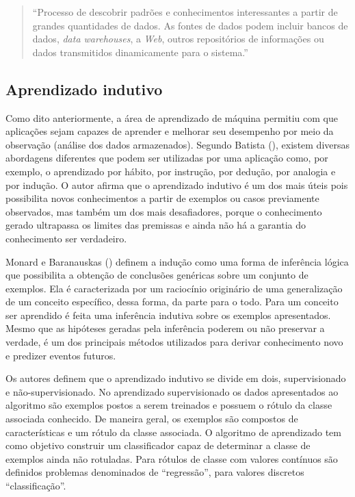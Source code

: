 \begin{quote}
    “Processo de descobrir padrões e conhecimentos interessantes a partir de grandes quantidades de dados. As fontes de dados podem incluir bancos de dados, \textit{data warehouses}, a \textit{Web}, outros repositórios de informações ou dados transmitidos dinamicamente para o sistema.” 
\end{quote}

\subsection{Aprendizado indutivo}

Como dito anteriormente, a área de aprendizado de máquina permitiu com que aplicações sejam capazes de aprender e melhorar seu desempenho por meio da observação (análise dos dados armazenados). Segundo Batista (\citeyear{Batista}), existem diversas abordagens diferentes que podem ser utilizadas por uma aplicação como, por exemplo, o aprendizado por hábito, por instrução, por dedução, por analogia e por indução. O autor afirma que o aprendizado indutivo é um dos mais úteis pois possibilita novos conhecimentos a partir de exemplos ou casos previamente observados, mas também um dos mais desafiadores, porque o conhecimento gerado ultrapassa os limites das premissas e ainda não há a garantia do conhecimento ser verdadeiro.

Monard e Baranauskas (\citeyear{Monard:2003}) definem a indução como uma forma de inferência lógica que possibilita a obtenção de conclusões genéricas sobre um conjunto de exemplos. Ela é caracterizada por um raciocínio originário de uma generalização de um conceito específico, dessa forma, da parte para o todo. Para um conceito ser aprendido é feita uma inferência indutiva sobre os exemplos apresentados. Mesmo que as hipóteses geradas pela inferência poderem ou não preservar a verdade, é um dos principais métodos utilizados para derivar conhecimento novo e predizer eventos futuros.

Os autores definem que o aprendizado indutivo se divide em dois, supervisionado e não-supervisionado. No aprendizado supervisionado os dados apresentados ao algoritmo são exemplos postos a serem treinados e possuem o rótulo da classe associada conhecido. De maneira geral, os exemplos são compostos de características e um rótulo da classe associada. O algoritmo de aprendizado tem como objetivo construir um classificador capaz de determinar a classe de exemplos ainda não rotuladas. Para rótulos de classe com valores contínuos são definidos problemas denominados de “regressão”, para valores discretos  “classificação”.


